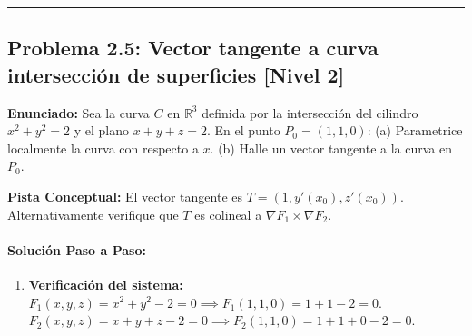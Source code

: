 \documentclass[11pt,a4paper]{article}
\begin{document}
\vspace{0.5cm}
\hrule
\vspace{0.5cm}

\subsection*{Problema 2.5: Vector tangente a curva intersección de superficies \hfill \color{primaryblue}\small[Nivel 2]}

\begin{tcolorbox}[colback=white,colframe=gray!40,arc=1mm,boxrule=0.5pt,left=3mm,right=3mm,top=2mm,bottom=2mm]
\textbf{Enunciado:} Sea la curva $C$ en $\mathbb{R}^3$ definida por la intersección del cilindro $x^2 + y^2 = 2$ y el plano $x + y + z = 2$. En el punto $P_0 = (1, 1, 0)$: (a) Parametrice localmente la curva con respecto a $x$. (b) Halle un vector tangente a la curva en $P_0$.
\end{tcolorbox}

\begin{tcolorbox}[colback=yellow!4,colframe=accentamber!70,arc=1mm,boxrule=0.5pt,left=3mm,right=3mm,top=1.5mm,bottom=1.5mm]
\textbf{Pista Conceptual:} El vector tangente es $T = (1, y'(x_0), z'(x_0))$. Alternativamente verifique que $T$ es colineal a $\nabla F_1 \times \nabla F_2$.
\end{tcolorbox}

\paragraph{Solución Paso a Paso:}\par
\begin{enumerate}[label=\textbf{\arabic*.}]
\item \textbf{Verificación del sistema:}
$F_1(x,y,z) = x^2 + y^2 - 2 = 0 \implies F_1(1,1,0) = 1+1-2 = 0$.
$F_2(x,y,z) = x + y + z - 2 = 0 \implies F_2(1,1,0) = 1+1+0-2 = 0$.
\end{enumerate}
\end{document}
